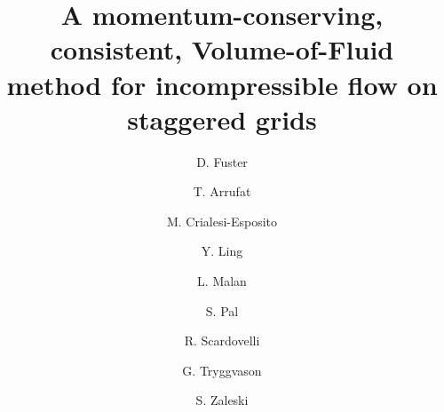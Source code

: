 \documentclass[times,final]{elsarticle}
\begin{document}

\begin{frontmatter}



\title{A momentum-conserving, consistent, Volume-of-Fluid method for incompressible flow on staggered grids}

\author[b]{D. Fuster}
\author[b]{T. Arrufat}
\author[f]{M. Crialesi-Esposito}
\author[a]{Y. Ling}
\author[b,d]{L. Malan}
\author[b]{S. Pal}
\author[e]{R. Scardovelli}
\author[label1]{G. Tryggvason}
\author[b]{S. Zaleski}
\address[b]{Sorbonne Universit\'e et CNRS, \\Institut Jean Le Rond d'Alembert, UMR 7190, Paris, France}
\address[f]{CMT-Motores T\'ermicos, Universitat Polit\'ecnica de Val\'encia, Camino de Vera, s/n, Edificio 6D, Valencia, Spain}
\address[d]{InCFD, Dept. of Mechanical Engineering, University of Cape Town, South Africa}
\address[e]{ DIN - Lab. di Montecuccolino, Universit\`a di Bologna, I-40136 Bologna, Italy}
\address[label1]{Mechanical Engineering, Johns Hopkins University, Baltimore, USA}
\address[a]{Dept. of Mechanical Engineering, Baylor University, Waco, TX, USA} 



\end{frontmatter}
\end{document}
